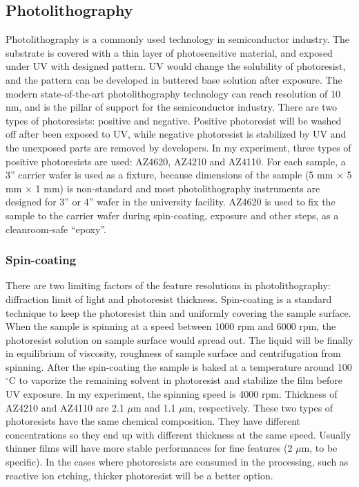 \documentclass[pdflatex, sectionletters, 12pt]{pittetd}    %
\begin{document}
\subsection{Photolithography}
\label{SEC:Photolithography}

Photolithography is a commonly used technology in semiconductor industry. The substrate is covered with a thin layer of photosensitive material, and exposed under UV with designed pattern. UV would change the solubility of photoresist, and the pattern can be developed in buttered base solution after exposure. The modern state-of-the-art photolithography technology can reach resolution of 10 nm, and is the pillar of support for the semiconductor industry. There are two types of photoresists: positive and negative. Positive photoresist will be washed off after been exposed to UV, while negative photoresist is stabilized by UV and the unexposed parts are removed by developers. In my experiment, three types of positive photoresists are used: AZ4620, AZ4210 and AZ4110. For each sample, a 3'' carrier wafer is used as a fixture, because dimensions of the sample (5 mm $\times$ 5 mm $\times$ 1 mm) is non-standard and most photolithography instruments are designed for 3'' or 4'' wafer in the university facility. AZ4620 is used to fix the sample to the carrier wafer during spin-coating, exposure and other steps, as a cleanroom-safe ``epoxy''. 


\subsubsection{Spin-coating}

There are two limiting factors of the feature resolutions in photolithography: diffraction limit of light and photoresist thickness. Spin-coating is a standard technique to keep the photoresist thin and uniformly covering the sample surface. When the sample is spinning at a speed between 1000 rpm and 6000 rpm, the photoresist solution on sample surface would spread out. The liquid will be finally in equilibrium of viscosity, roughness of sample surface and centrifugation from spinning. After the spin-coating the sample is baked at a temperature around 100$^{\circ}$C to vaporize the remaining solvent in photoresist and stabilize the film before UV exposure. In my experiment, the spinning speed is 4000 rpm. Thickness of AZ4210 and AZ4110 are 2.1 $\mu$m and 1.1 $\mu$m, respectively. These two types of photoresists have the same chemical composition. They have different concentrations so they end up with different thickness at the same speed. Usually thinner films will have more stable performances for fine features (2 $\mu$m, to be specific). In the cases where photoresists are consumed in the processing, such as reactive ion etching, thicker photoresist will be a better option.
\end{document}
